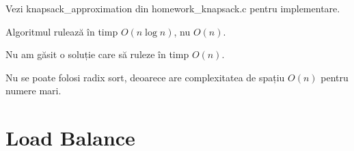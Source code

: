 \documentclass[a4paper,12pt]{article}
\begin{document}
\begin{enumerate}
\begin{enumerate}
                        Vezi knapsack\_approximation din homework\_knapsack.c pentru implementare.

                        Algoritmul rulează în timp $O(n \log n)$, nu $O(n)$.

                        Nu am găsit o soluție care să ruleze în timp $O(n)$.

                        Nu se poate folosi radix sort, deoarece are complexitatea de spațiu $O(n)$
                        pentru numere mari.

            \end{enumerate}

\end{enumerate}


\section{Load Balance}
\end{document}
